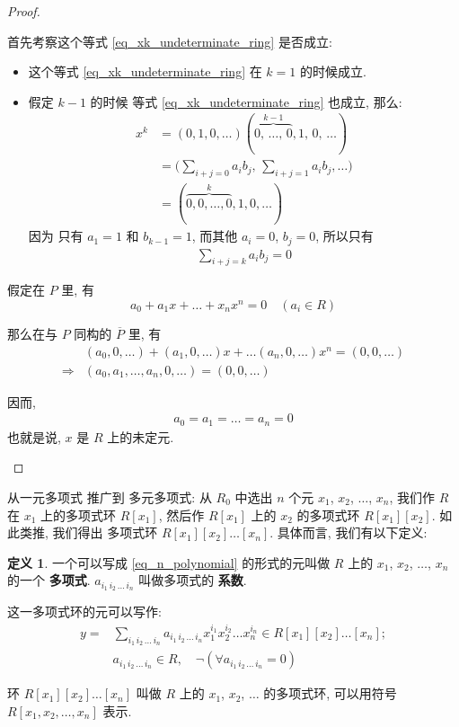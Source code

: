 \documentclass[utf8]{ctexbook}
\theoremstyle{definition}
\newtheorem{protodefinition}{定义}[section]
\newenvironment{definition}
   {\colorlet{shadecolor}{black!15}\begin{shaded}\begin{protodefinition}}
   {\end{protodefinition}\end{shaded}}
\begin{document}
\begin{proof}
\begin{enumerate}
{首先考察这个等式 \ref{eq_xk_undeterminate_ring} 是否成立:
\begin{itemize}
\item{这个等式 \ref{eq_xk_undeterminate_ring} 在 $k=1$ 的时候成立.}
\item{假定 $k-1$ 的时候 等式 \ref{eq_xk_undeterminate_ring} 也成立, 那么:
\begin{align*}
x^k & = (0, 1, 0, \ldots) (  \overbrace{0, \, \ldots, \, 0}^{k-1},  1, \, 0, \, \ldots )  \\
 & = \Big( \sum_{i+j = 0} a_i b_j, \, \sum_{i+j=1} a_i b_j ,\ldots \Big) \\
 & = (\overbrace{0, 0, \ldots, 0}^{k} , 1, 0, \ldots )
\end{align*}
因为 只有 $a_1 =1 $ 和  $b_{k-1} =1 $, 而其他 $a_i =0$, $b_j = 0$, 所以只有
\begin{align*}
\sum_{i+j = k} a_i b_j = 0
\end{align*}
}
\end{itemize}

假定在 $P$ 里, 有
\begin{equation}
a_0 + a_1 x + \ldots + x_n x^n = 0 \quad (a_i \in R) \nonumber
\end{equation}

那么在与 $P$ 同构的 $\overline{P}$ 里, 有
\begin{align*}
& (a_0, 0, \ldots ) + (a_1, 0, \ldots ) x + \ldots (a_n, 0, \ldots ) x^n = (0, 0, \ldots) \\
\Longrightarrow & (a_0, a_1, \ldots , a_n, 0, \ldots) = (0,0, \ldots )
\end{align*}

因而,
\begin{align*}
a_0 = a_1 = \ldots = a_n = 0
\end{align*}
也就是说, $x$ 是 $R$ 上的未定元.
}
\end{enumerate}

\end{proof}

从一元多项式 推广到 多元多项式: 从 $R_0$ 中选出 $n$ 个元 $x_1$, $x_2$, $\ldots$, $x_n$, 我们作 $R$ 在 $x_1$ 上的多项式环 $R[x_1]$, 然后作  $R[x_1]$ 上的 $x_2$ 的多项式环 $R[x_1][x_2]$. 如此类推, 我们得出 多项式环 $R[x_1][x_2]\ldots[x_n]$. 具体而言, 我们有以下定义:

\begin{definition}
一个可以写成 \ref{eq_n_polynomial} 的形式的元叫做 $R$ 上的 $x_1$, $x_2$, $\ldots$, $x_n$ 的一个 \textbf{多项式}. $a_{i_1 \, i_2 \, \ldots \, i_n} $ 叫做多项式的 \textbf{系数}.

这一多项式环的元可以写作:
\begin{align}
 y = & \sum_{i_1 \, i_2 \, \ldots \, i_n} a_{i_1 \, i_2 \, \ldots \, i_n} x_1 ^{i_1} x_2 ^{i_2} \ldots x_n ^{i_n}  \in R[x_1][x_2]\ldots[x_n] ; \label{eq_n_polynomial} \\
& a_{i_1 \, i_2 \, \ldots \, i_n} \in R, \quad \lnot ( \forall a_{i_1 \, i_2 \, \ldots \, i_n} = 0 ) \nonumber
\end{align}

环 $R[x_1][x_2]\ldots[x_n]$ 叫做 $R$ 上的 $x_1$, $x_2$, $\ldots$ 的多项式环, 可以用符号 $R[x_1, x_2, \ldots, x_n]$ 表示.
\end{definition}
\end{document}
